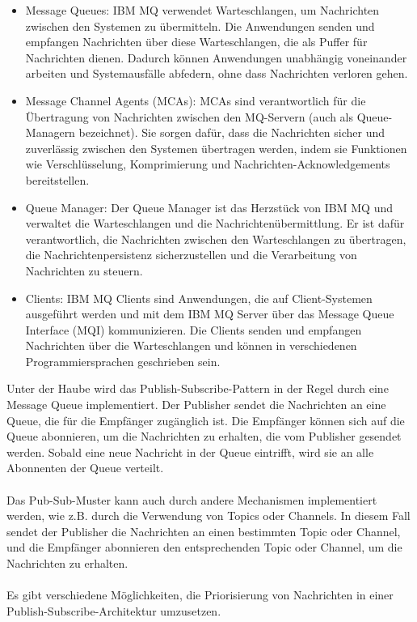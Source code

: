 \documentclass[../vs-script-first-v01.tex]{subfiles}
\begin{document}
\begin{itemize}
\item Message Queues: IBM MQ verwendet Warteschlangen, um Nachrichten zwischen den Systemen zu übermitteln. Die Anwendungen senden und empfangen Nachrichten über diese Warteschlangen, die als Puffer für Nachrichten dienen. Dadurch können Anwendungen unabhängig voneinander arbeiten und Systemausfälle abfedern, ohne dass Nachrichten verloren gehen.
\item Message Channel Agents (MCAs): MCAs sind verantwortlich für die Übertragung von Nachrichten zwischen den MQ-Servern (auch als Queue-Managern bezeichnet). Sie sorgen dafür, dass die Nachrichten sicher und zuverlässig zwischen den Systemen übertragen werden, indem sie Funktionen wie Verschlüsselung, Komprimierung und Nachrichten-Acknowledgements bereitstellen.
\item Queue Manager: Der Queue Manager ist das Herzstück von IBM MQ und verwaltet die Warteschlangen und die Nachrichtenübermittlung. Er ist dafür verantwortlich, die Nachrichten zwischen den Warteschlangen zu übertragen, die Nachrichtenpersistenz sicherzustellen und die Verarbeitung von Nachrichten zu steuern.
\item Clients: IBM MQ Clients sind Anwendungen, die auf Client-Systemen ausgeführt werden und mit dem IBM MQ Server über das Message Queue Interface (MQI) kommunizieren. Die Clients senden und empfangen Nachrichten über die Warteschlangen und können in verschiedenen Programmiersprachen geschrieben sein.
\end{itemize}

Unter der Haube wird das Publish-Subscribe-Pattern in der Regel durch eine Message Queue implementiert. Der Publisher sendet die Nachrichten an eine Queue, die für die Empfänger zugänglich ist. Die Empfänger können sich auf die Queue abonnieren, um die Nachrichten zu erhalten, die vom Publisher gesendet werden. Sobald eine neue Nachricht in der Queue eintrifft, wird sie an alle Abonnenten der Queue verteilt.
\\\\
Das Pub-Sub-Muster kann auch durch andere Mechanismen implementiert werden, wie z.B. durch die Verwendung von Topics oder Channels. In diesem Fall sendet der Publisher die Nachrichten an einen bestimmten Topic oder Channel, und die Empfänger abonnieren den entsprechenden Topic oder Channel, um die Nachrichten zu erhalten.
\\\\
Es gibt verschiedene Möglichkeiten, die Priorisierung von Nachrichten in einer Publish-Subscribe-Architektur umzusetzen.
\end{document}
